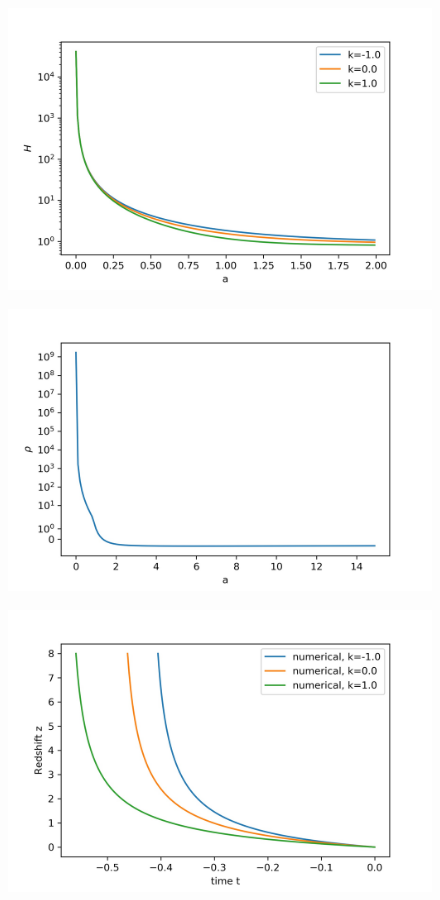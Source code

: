 \documentclass[a4paper, 11pt]{FSKH_623_Report}
\numberwithin{equation}{section}
\begin{document}
\begin{figure}[H]
\centering
\includegraphics[scale=1]{Figures/UDF_H.jpg}
\caption{}
\end{figure}

\begin{figure}[H]
\centering
\includegraphics[scale=1]{Figures/UDF_rho.jpg}
\caption{}
\end{figure}

\begin{figure}[H]
\centering
\includegraphics[scale=1]{Figures/UDF_z_vs_t.jpg}
\caption{}
\end{figure}
\end{document}
